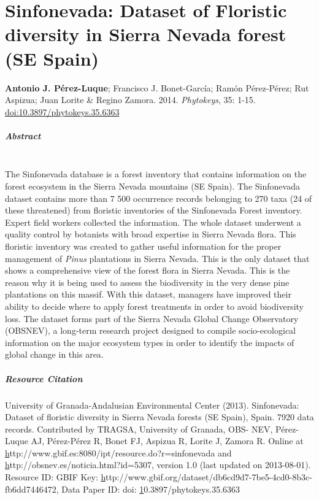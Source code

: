 %
\chapter{Sinfonevada: Dataset of Floristic diversity in Sierra Nevada forest (SE Spain)}\label{sec:sinfonevada}

\mbox{}
\vfill
{\color{ctcolormain}\textbf{Antonio J. Pérez-Luque}}; Francisco J. Bonet-García; Ramón Pérez-Pérez; Rut Aspizua; Juan Lorite \& Regino Zamora. 2014. \emph{Phytokeys}, 35: 1-15. \href{https://doi.org/10.3897/phytokeys.35.6363}{doi:10.3897/phytokeys.35.6363}



\newpage

\paragraph{Abstract} \mbox{} \\
The Sinfonevada database is a forest inventory that contains information on the forest ecosystem in the Sierra Nevada mountains (SE Spain). The Sinfonevada dataset contains more than 7 500 occurrence records belonging to 270 taxa (24 of these threatened) from floristic inventories of the Sinfonevada Forest inventory. Expert field workers collected the information. The whole dataset underwent a quality control by botanists with broad expertise in Sierra Nevada flora. This floristic inventory was created to gather useful information for the proper management of \textit{Pinus} plantations in Sierra Nevada. This is the only dataset that shows a comprehensive view of the forest flora in Sierra Nevada. This is the reason why it is being used to assess the biodiversity in the very dense pine plantations on this massif. With this dataset, managers have improved their ability to decide where to apply forest treatments in order to avoid biodiversity loss. The dataset forms part of the Sierra Nevada Global Change Observatory (OBSNEV), a long-term research project designed to compile socio-ecological information on the major ecosystem types in order to identify the impacts of global change in this area.

\newpage

\paragraph{Resource Citation}
University of Granada-Andalusian Environmental Center (2013). Sinfonevada: Dataset of floristic diversity in Sierra Nevada forests (SE Spain), Spain. 7920 data records. Contributed by TRAGSA, University of Granada, OBS- NEV, Pérez-Luque AJ, Pérez-Pérez R, Bonet FJ, Aspizua R, Lorite J, Zamora R. Online at \href{http://www.gbif.es:8080/ipt/resource.do?r=sinfonevada}http://www.gbif.es:8080/ipt/resource.do?r=sinfonevada and \href{http://obsnev.es/noticia.html?id=5307}http://obsnev.es/noticia.html?id=5307, version 1.0 (last updated on 2013-08-01). Resource ID: GBIF Key: \href{http://www.gbif.org/dataset/db6cd9d7-7be5-4cd0-8b3c-fb6dd7446472}http://www.gbif.org/dataset/db6cd9d7-7be5-4cd0-8b3c-fb6dd7446472, Data Paper ID: doi: \href{10.3897/phytokeys.35.6363}10.3897/phytokeys.35.6363
